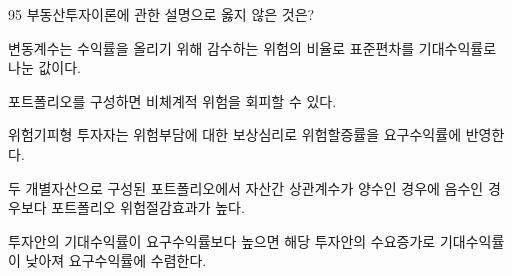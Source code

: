 \begin{question}{95}
부동산투자이론에 관한 설명으로 옳지 않은 것은?
\begin{choices}
  \item 변동계수는 수익률을 올리기 위해 감수하는 위험의 비율로 표준편차를 기대수익률로 나눈 값이다.
  \item 포트폴리오를 구성하면 비체계적 위험을 회피할 수 있다.
  \item 위험기피형 투자자는 위험부담에 대한 보상심리로 위험할증률을 요구수익률에 반영한다.
  \item 두 개별자산으로 구성된 포트폴리오에서 자산간 상관계수가 양수인 경우에 음수인 경우보다 포트폴리오 위험절감효과가 높다.
  \item 투자안의 기대수익률이 요구수익률보다 높으면 해당 투자안의 수요증가로 기대수익률이 낮아져 요구수익률에 수렴한다.
\end{choices}
\end{question}
